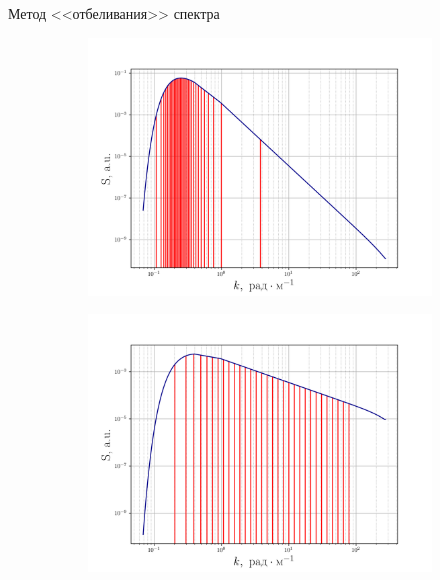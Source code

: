 \documentclass[10pt,pdf,hyperref={unicode}, dvipsnames]{beamer}
\begin{document}
\begin{frame}[t]{Метод <<отбеливания>> спектра}
\begin{figure}[h!]
    \begin{subfigure}{0.49\linewidth}
        \includegraphics[width=\linewidth]{fig/fig1}
    \end{subfigure}
    \begin{subfigure}{0.49\linewidth}
        \includegraphics[width=\linewidth]{fig/fig2}
    \end{subfigure}
    \begin{subfigure}{0.49\linewidth}

\end{subfigure}
\end{figure}
\end{frame}
\end{document}
